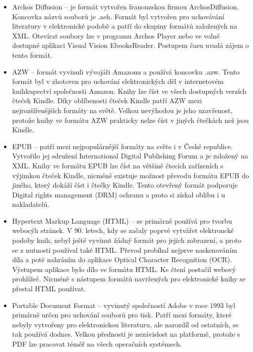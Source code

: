             \begin{itemize}
                \item Archos Diffusion – je formát vytvořen franouzskou firmou  ArchosDiffusion. Koncovka názvů souborů je .aeh. Formát byl vytvořen pro uchovávání literatury v elektronické podobě a patří do skupiny formátů založených na XML. Otevírat soubory lze v programu Archos Player nebo ve volně dostupné aplikaci Visual Vision EbooksReader. Postupem času uvadá zájem o tento formát.
                
                \item AZW – formát vyvinuli vývojáři Amazonu a používá koncovku .azw. Tento formát byl v zhotoven pro uchování elektronických děl v internetovém knihkupectví společnosti Amazon. Knihy lze číst ve všech dostupných verzích čteček Kindle. Díky oblíbenosti čteček Kindle patří AZW mezi nejrozšířenějších formáty na světě. Velkou nevýhodou je jeho uzavřenost, protože knihy ve formátu AZW prakticky nelze číst v jiných čtečkách než jsou Kindle.
                
                \item EPUB – patří mezi nejpopulárnější formáty na světe i v České republice. Vytvořilo jej sdružení International Digital Publishing Forum a je založený na XML. Knihy ve formátu EPUB lze číst na většině čtecích zařízeních s výjimkou čteček Kindle, nicméně existuje možnost převodu formátu EPUB do jiného, který dokáží číst i čtečky Kindle. Tento otevřený formát podporuje Digital rights management (DRM) ochranu a proto si získal oblibu i u nakladatelů.
                
                \item Hypertext Markup Language (HTML) – se primárně používá pro tvorbu webocýh stránek. V 90. letech, kdy se začaly poprvé vytvářet elektroncké podoby knih, nebyl ještě vyvinut žádný formát pro jejich zobrazení, a proto se z nutnosti používal také HTML. Převod probíhal nejprve naskenováním díla a poté nahráním do aplikace Optical Character Recognition (OCR). Výstupem aplikace bylo dílo ve formátu HTML. Ke čtení postačil webový prohlížeč. Nicméně s nástupem formátů navržených pro elektronické knihy se přestal HTML používat.
                
                \item Portable Document Format – vyvinutý společností Adobe v roce 1993 byl primárně určen pro uchování souborů pro tisk. Patří mezi formáty, které nebyly vytvořeny pro elektronickou literaturu, ale narozdíl od ostatních, se tak používá dodnes. Velkou předností je nezávislost na platformě, protože s PDF lze pracovat téměř na všech operačních systémech. 
                

\end{itemize}
